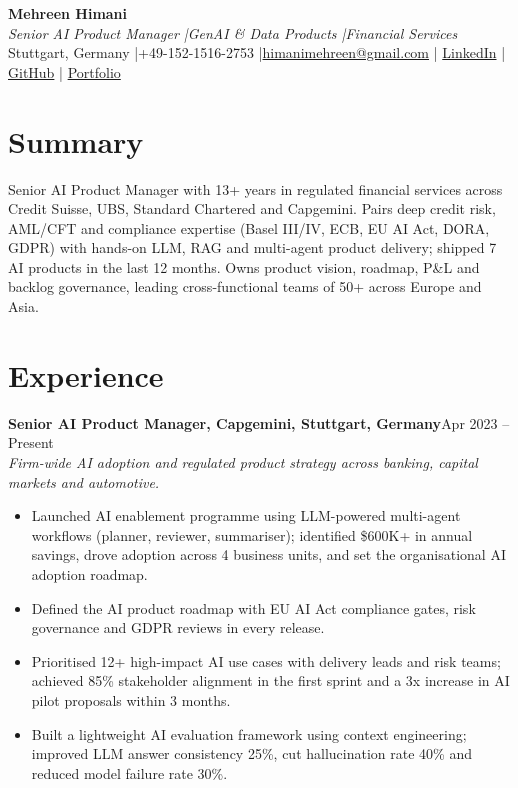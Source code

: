 \documentclass[10pt,letterpaper]{article}
\newcommand{\role}[3]{%
  \needspace{5\baselineskip}%
  {\fontsize{11}{13}\selectfont\bfseries #1}\hfill{\fontsize{11}{13}\selectfont #2}\\
  {\itshape #3}%
}
\newcommand{\gap}{\vspace{6.5pt}}
\newcommand{\sep}{\unskip\hspace{0.5em}|\hspace{0.5em}\ignorespaces}
\begin{document}
\begin{center}
  {\fontsize{21}{25}\selectfont\bfseries Mehreen Himani}\\[3pt]
  {\fontsize{12}{14}\selectfont\itshape Senior AI Product Manager \sep GenAI \& Data Products \sep Financial Services}\\[3pt]
  Stuttgart, Germany \sep +49-152-1516-2753 \sep \href{mailto:himanimehreen@gmail.com}{himanimehreen@gmail.com} \sep
  \href{https://www.linkedin.com/in/mehreenhimani}{LinkedIn} \sep
  \href{https://github.com/mehreenhimani}{GitHub} \sep
  \href{https://mehreens-ai-story.lovable.app}{Portfolio}
\end{center}
\vspace{-8pt}

\section{Summary}
Senior AI Product Manager with 13+ years in regulated financial services across Credit Suisse, UBS, Standard Chartered and
Capgemini. Pairs deep credit risk, AML/CFT and compliance expertise (Basel III/IV, ECB, EU AI Act, DORA, GDPR) with hands-on
LLM, RAG and multi-agent product delivery; shipped 7 AI products in the last 12 months. Owns product vision, roadmap, P\&L and
backlog governance, leading cross-functional teams of 50+ across Europe and Asia.

\section{Experience}

\role{Senior AI Product Manager, Capgemini, Stuttgart, Germany}{Apr 2023 -- Present}
{Firm-wide AI adoption and regulated product strategy across banking, capital markets and automotive.}
\begin{itemize}
  \item Launched AI enablement programme using LLM-powered multi-agent workflows (planner, reviewer, summariser); identified
        \$600K+ in annual savings, drove adoption across 4 business units, and set the organisational AI adoption roadmap.
  \item Defined the AI product roadmap with EU AI Act compliance gates, risk governance and GDPR reviews in every release.
  \item Prioritised 12+ high-impact AI use cases with delivery leads and risk teams; achieved 85\% stakeholder alignment in the
        first sprint and a 3x increase in AI pilot proposals within 3 months.
  \item Built a lightweight AI evaluation framework using context engineering; improved LLM answer consistency 25\%, cut
        hallucination rate 40\% and reduced model failure rate 30\%.
\end{itemize}
\gap
\end{document}
